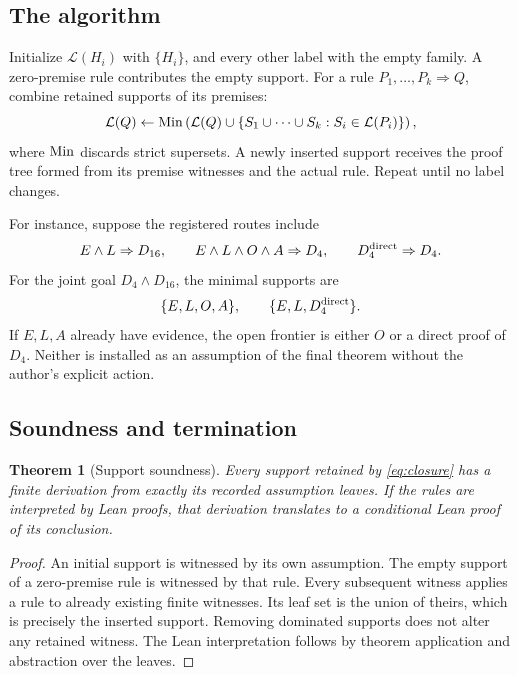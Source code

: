 \documentclass[11pt,a4paper]{article}
\newcommand{\Supp}{\mathcal L}\newcommand{\Front}{\mathcal F}
\numberwithin{equation}{section}
\newtheorem{theorem}{Theorem}[section]
\theoremstyle{definition}\newtheorem{definition}[theorem]{Definition}
\theoremstyle{remark}\newtheorem{remark}[theorem]{Remark}
\begin{document}
\subsection{The algorithm}
Initialize \(\Supp(H_i)\) with \(\{H_i\}\), and every other label with the
empty family. A zero-premise rule contributes the empty support. For a rule
\(P_1,\ldots,P_k\Rightarrow Q\), combine retained supports of its premises:
\begin{equation}\label{eq:closure}
 \Supp(Q)\leftarrow\Min\left(
 \Supp(Q)\cup
 \left\{S_1\cup\cdots\cup S_k:
             S_i\in\Supp(P_i)\right\}\right),
\end{equation}
where \(\operatorname{Min}\) discards strict supersets. A newly inserted support receives
the proof tree formed from its premise witnesses and the actual rule.
Repeat until no label changes.

For instance, suppose the registered routes include
\[
 E\land L\Rightarrow D_{16},\qquad
 E\land L\land O\land A\Rightarrow D_4,\qquad
 D_4^{\rm direct}\Rightarrow D_4.
\]
For the joint goal \(D_4\land D_{16}\), the minimal supports are
\[
 \{E,L,O,A\},\qquad \{E,L,D_4^{\rm direct}\}.
\]
If \(E,L,A\) already have evidence, the open frontier is either \(O\) or a
direct proof of \(D_4\). Neither is installed as an assumption of the final
theorem without the author's explicit action.

\subsection{Soundness and termination}
\begin{theorem}[Support soundness]\label{thm:sound}
Every support retained by \eqref{eq:closure} has a finite derivation from exactly its recorded
assumption leaves. If the rules are interpreted by Lean proofs, that
derivation translates to a conditional Lean proof of its conclusion.
\end{theorem}
\begin{proof}
An initial support is witnessed by its own assumption. The empty support of a
zero-premise rule is witnessed by that rule. Every subsequent witness applies
a rule to already existing finite witnesses. Its leaf set is the union of
theirs, which is precisely the inserted support. Removing dominated supports
does not alter any retained witness. The Lean interpretation follows by
theorem application and abstraction over the leaves.
\end{proof}
\end{document}
